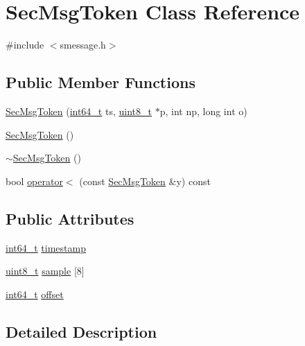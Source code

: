 \hypertarget{class_sec_msg_token}{}\section{Sec\+Msg\+Token Class Reference}
\label{class_sec_msg_token}


{\ttfamily \#include $<$smessage.\+h$>$}

\subsection*{Public Member Functions}
\begin{DoxyCompactItemize}
\item 
\hyperlink{class_sec_msg_token_afab3652ec51eb938aca1d922e565a91d}{Sec\+Msg\+Token} (\hyperlink{stdint_8h_adec1df1b8b51cb32b77e5b86fff46471}{int64\+\_\+t} ts, \hyperlink{stdint_8h_aba7bc1797add20fe3efdf37ced1182c5}{uint8\+\_\+t} $\ast$p, int np, long int o)
\item 
\hyperlink{class_sec_msg_token_a8f4b8e10e090e523958c85bdff065f77}{Sec\+Msg\+Token} ()
\item 
\hyperlink{class_sec_msg_token_a35a5c515530de2ff38c618ad08c812de}{$\sim$\+Sec\+Msg\+Token} ()
\item 
bool \hyperlink{class_sec_msg_token_a565aa7d13b5a90aa9a028f3bfeb8227b}{operator$<$} (const \hyperlink{class_sec_msg_token}{Sec\+Msg\+Token} \&y) const 
\end{DoxyCompactItemize}
\subsection*{Public Attributes}
\begin{DoxyCompactItemize}
\item 
\hyperlink{stdint_8h_adec1df1b8b51cb32b77e5b86fff46471}{int64\+\_\+t} \hyperlink{class_sec_msg_token_ae38e93419379e9d202e386aa9dda193b}{timestamp}
\item 
\hyperlink{stdint_8h_aba7bc1797add20fe3efdf37ced1182c5}{uint8\+\_\+t} \hyperlink{class_sec_msg_token_a5cda3c8fcc7e167458c7b28bd6acc9e4}{sample} \mbox{[}8\mbox{]}
\item 
\hyperlink{stdint_8h_adec1df1b8b51cb32b77e5b86fff46471}{int64\+\_\+t} \hyperlink{class_sec_msg_token_a65aeb2a37d1653ae97c2fe5c32c0c4b2}{offset}
\end{DoxyCompactItemize}


\subsection{Detailed Description}


